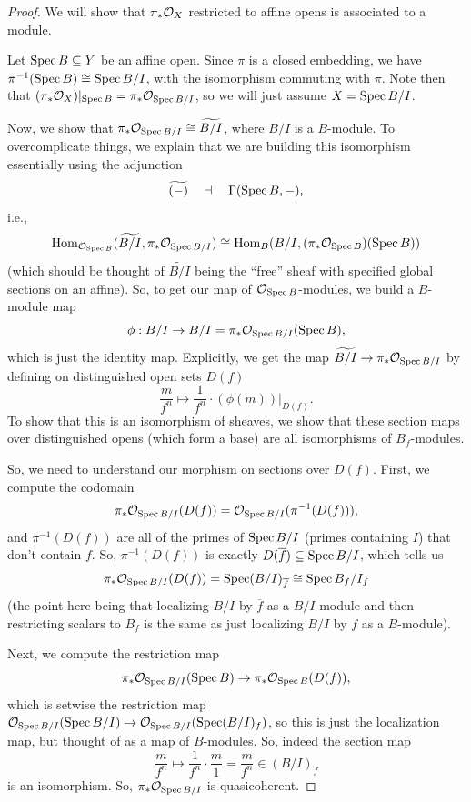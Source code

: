 \documentclass[12pt]{article}
\begin{document}
\begin{proof}
    We will show that $\pi_* \mathcal{O}_X$ restricted to affine opens is associated to a module.
    
    Let $\operatorname{Spec} B \subseteq Y$ be an affine open. Since $\pi$ is a closed embedding, we have $\pi^{-1}(\operatorname{Spec} B) \cong \operatorname{Spec} B/I$, with the isomorphism commuting with $\pi$. Note then that $(\pi_* \mathcal{O}_X)|_{\operatorname{Spec} B} = \pi_* \mathcal{O}_{\operatorname{Spec} B/I}$, so we will just assume $X=\operatorname{Spec} B/I$.
    
    Now, we show that $\pi_* \mathcal{O}_{\operatorname{Spec} B/I} \cong \widetilde{B/I}$, where $B/I$ is a $B$-module. To overcomplicate things, we explain that we are building this isomorphism essentially using the adjunction
    \[\widetilde{(-)} \quad \dashv \quad \Gamma(\operatorname{Spec} B, -),\]
    i.e.,
    \[\mathrm{Hom}_{\mathcal{O}_{\operatorname{Spec} B}}(\widetilde{B/I}, \pi_* \mathcal{O}_{\operatorname{Spec} B/I}) \cong \mathrm{Hom}_B(B/I, (\pi_* \mathcal{O}_{\operatorname{Spec} B})(\operatorname{Spec} B))\]
    (which should be thought of $\tilde{B/I}$ being the ``free'' sheaf with specified global sections on an affine). So, to get our map of $\mathcal{O}_{\operatorname{Spec} B}$-modules, we build a $B$-module map
    \[\phi: B/I \to B/I = \pi_*\cO_{\Spec B/I}(\Spec B),\]
    which is just the identity map. Explicitly, we get the map $\widetilde{B/I} \to \pi_* \mathcal{O}_{\operatorname{Spec} B/I}$ by defining on distinguished open sets $D(f)$
    \[\frac{m}{f^n} \mapsto \frac{1}{f^n} \cdot (\phi(m))|_{D(f)}.\]
    To show that this is an isomorphism of sheaves, we show that these section maps over distinguished opens (which form a base) are all isomorphisms of $B_f$-modules.

    So, we need to understand our morphism on sections over $D(f)$. First, we compute the codomain
    \[\pi_* \mathcal{O}_{\operatorname{Spec} B/I}(D(f)) = \mathcal{O}_{\operatorname{Spec} B/I}(\pi^{-1}(D(f))),\]
    and $\pi^{-1}(D(f))$ are all of the primes of $\operatorname{Spec} B/I$ (primes containing $I$) that don't contain $f$. So, $\pi^{-1}(D(f))$ is exactly $D(\overline{f})\subseteq \operatorname{Spec} B/I$, which tells us
    \[\pi_* \mathcal{O}_{\operatorname{Spec} B/I}(D(f)) = \operatorname{Spec} (B/I)_{\overline{f}} \cong \operatorname{Spec} B_f/I_f\]
    (the point here being that localizing $B/I$ by $\overline{f}$ as a $B/I$-module and then restricting scalars to $B_f$ is the same as just localizing $B/I$ by $f$ as a $B$-module).
    
    Next, we compute the restriction map
    \[\pi_*\mathcal{O}_{\operatorname{Spec} B/I}(\operatorname{Spec} B) \to \pi_*\mathcal{O}_{\operatorname{Spec} B}(D(f)),\]
    which is setwise the restriction map $\mathcal{O}_{\operatorname{Spec} B/I}(\operatorname{Spec} B/I) \to \mathcal{O}_{\operatorname{Spec} B/I}(\operatorname{Spec} (B/I)_f)$, so this is just the localization map, but thought of as a map of $B$-modules. So, indeed the section map
    \[\frac{m}{f^n} \mapsto \frac{1}{f^n}\cdot \frac{m}{1} = \frac{m}{f^n} \in (B/I)_{f}\]
    is an isomorphism. So, $\pi_* \mathcal{O}_{\operatorname{Spec}{B/I}}$ is quasicoherent.
\end{proof}
\end{document}
